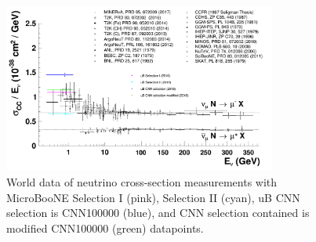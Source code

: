 \begin{figure}[htp!]
\centering
\includegraphics[angle=90,width=0.8\textwidth]{figs/c_data_PDB_02.png}
\caption{World data of neutrino cross-section measurements with MicroBooNE Selection I (pink), Selection II (cyan), uB CNN selection is CNN100000 (blue), and CNN selection contained is modified CNN100000 (green) datapoints.}
\label{fig:xsec}
\end{figure}
